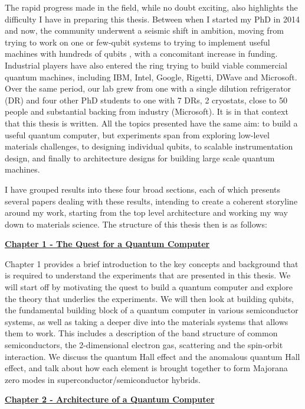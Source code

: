 The rapid progress made in the field, while no doubt exciting, also highlights the difficulty I have in
preparing this thesis. Between when I started my PhD in 2014 and now, the community underwent a seismic
shift in ambition, moving from trying to work on one or few-qubit systems \cite{iarpa_mqco} to trying
to implement useful machines with hundreds of qubits \cite{Monroe440}, with a concomitant increase in
funding. Industrial players have also
entered the ring trying to build viable commercial quantum machines, including IBM, Intel, Google, Rigetti,
DWave and Microsoft. Over the same period, our lab grew from one with a single dilution refrigerator (DR) and
four other PhD students to one with 7 DRs, 2 cryostats, close to 50 people and substantial backing
from industry (Microsoft). It is in that context that this thesis is written. All the topics presented have the
same aim: to build a useful quantum computer, but experiments span from exploring low-level materials challenges,
to designing individual qubits, to scalable instrumentation design, and finally to architecture
designs for building large scale quantum machines.

I have grouped results into these four broad sections, each of which presents several papers dealing
with these results, intending to create a coherent storyline around my work, starting from the top
level architecture and working my way down to materials science. The structure of this
thesis then is as follows:

\medskip
\noindent\textbf{\hyperref[sec:quest]{Chapter 1 - The Quest for a Quantum Computer}}

\noindent
Chapter 1 provides a brief introduction to the key concepts and background that is required to understand
the experiments that are presented in this thesis. We will start off by motivating the quest to build a quantum
computer and explore the theory that underlies the experiments. We will then look at building qubits,
the fundamental building block of a quantum computer in various semiconductor systems, as well as taking a
deeper dive into the materials systems that allows them to work. This includes a description of the band structure
of common semiconductors, the 2-dimensional electron gas, scattering and the spin-orbit interaction. We discuss
the quantum Hall effect and the anomalous quantum Hall effect, and talk about how each element is brought together
to form Majorana zero modes in superconductor/semiconductor hybrids.

\medskip
\noindent\textbf{\hyperref[sec:arch]{Chapter 2 - Architecture of a Quantum Computer}}

